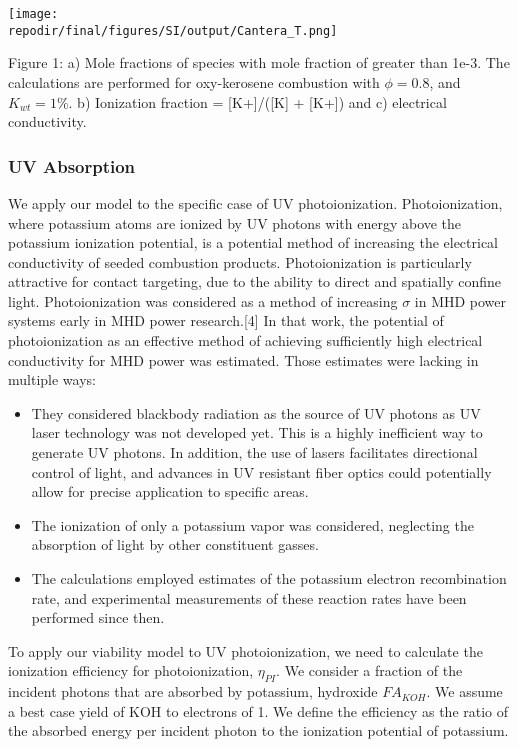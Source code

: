 \texttt{[image: \\repodir/final/figures/SI/output/Cantera\_T.png]}

Figure 1: a) Mole fractions of species with mole fraction of greater than 1e-3. The calculations are performed for oxy-kerosene combustion with \(\phi = 0.8\), and \(K_{wt} = 1\%\). b) Ionization fraction = {[}K+{]}/({[}K{]} + {[}K+{]}) and c) electrical conductivity.



\hypertarget{photoionization}{%
\subsubsection{UV Absorption}\label{photoionization}}



We apply our model to the specific case of UV photoionization. Photoionization, where potassium atoms are ionized by UV photons with energy above the potassium ionization potential, is a potential method of increasing the electrical conductivity of seeded combustion products. Photoionization is particularly attractive for contact targeting, due to the ability to direct and spatially confine light. Photoionization was considered as a method of increasing \(\sigma\) in MHD power systems early in MHD power research.{[}4{]} In that work, the potential of photoionization as an effective method of achieving sufficiently high electrical conductivity for MHD power was estimated. Those estimates were lacking in multiple ways:

\begin{itemize}
\item
  They considered blackbody radiation as the source of UV photons as UV laser technology was not developed yet. This is a highly inefficient way to generate UV photons. In addition, the use of lasers facilitates directional control of light, and advances in UV resistant fiber optics could potentially allow for precise application to specific areas.
\item
  The ionization of only a potassium vapor was considered, neglecting the absorption of light by other constituent gasses.
\item
  The calculations employed estimates of the potassium electron recombination rate, and experimental measurements of these reaction rates have been performed since then.
\end{itemize}

To apply our viability model to UV photoionization, we need to calculate the ionization efficiency for photoionization, \(\eta_{PI}\). We consider a fraction of the incident photons that are absorbed by potassium, hydroxide \(FA_{KOH}\). We assume a best case yield of KOH to electrons of 1. We define the efficiency as the ratio of the absorbed energy per incident photon to the ionization potential of potassium.


